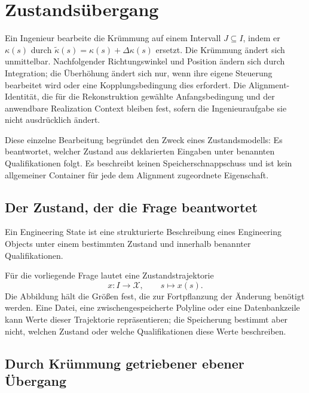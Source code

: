 
\chapter{Zustandsübergang}
\label{chap:state-model}

Ein Ingenieur bearbeite die Krümmung auf einem Intervall
\(J\subseteq I\), indem er \(\kappa(s)\) durch
\(\widetilde\kappa(s)=\kappa(s)+\Delta\kappa(s)\) ersetzt. Die Krümmung
ändert sich unmittelbar. Nachfolgender Richtungswinkel und Position ändern
sich durch Integration; die Überhöhung ändert sich nur, wenn ihre eigene
Steuerung bearbeitet wird oder eine Kopplungsbedingung dies erfordert. Die
Alignment-Identität, die für die Rekonstruktion gewählte Anfangsbedingung und
der anwendbare Realization Context bleiben fest, sofern die Ingenieuraufgabe
sie nicht ausdrücklich ändert.

Diese einzelne Bearbeitung begründet den Zweck eines Zustandsmodells: Es
beantwortet, welcher Zustand aus deklarierten Eingaben unter benannten
Qualifikationen folgt. Es beschreibt keinen Speicherschnappschuss und ist kein
allgemeiner Container für jede dem Alignment zugeordnete Eigenschaft.

\section{Der Zustand, der die Frage beantwortet}

\begin{definition}
\label{def:state}
Ein Engineering State ist eine strukturierte Beschreibung eines Engineering
Objects unter einem bestimmten Zustand und innerhalb benannter
Qualifikationen.
\end{definition}

Für die vorliegende Frage lautet eine Zustandstrajektorie
\[
x:I\rightarrow\mathcal X,
\qquad s\longmapsto x(s).
\]
Die Abbildung hält die Größen fest, die zur Fortpflanzung der Änderung
benötigt werden. Eine Datei, eine zwischengespeicherte Polyline oder eine
Datenbankzeile kann Werte dieser Trajektorie repräsentieren; die Speicherung
bestimmt aber nicht, welchen Zustand oder welche Qualifikationen diese Werte
beschreiben.

\section{Durch Krümmung getriebener ebener Übergang}

